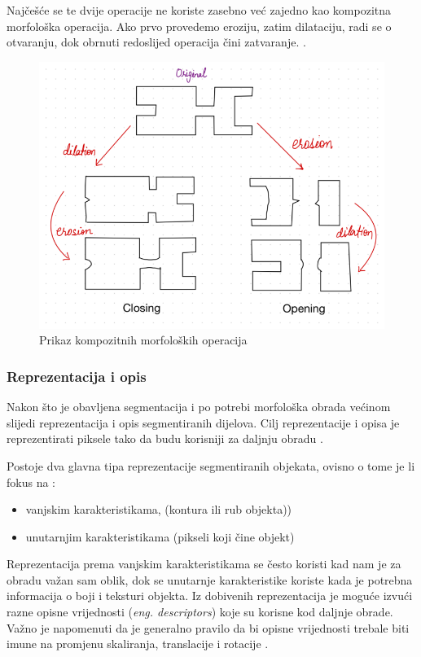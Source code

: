 \documentclass{foi}
\begin{document}
Najčešće se te dvije operacije ne koriste zasebno već zajedno kao kompozitna morfološka operacija. Ako prvo provedemo eroziju, zatim dilataciju, radi se o otvaranju, dok obrnuti redoslijed operacija čini zatvaranje. \cite{morph}.

\begin{figure}[H]
    \centering
    \includegraphics[width=0.6\linewidth]{slike/otvaranje_zatvaranje.png}
    \caption{Prikaz kompozitnih morfoloških operacija \cite{morph}}
\end{figure}

\subsubsection{Reprezentacija i opis}
Nakon što je obavljena segmentacija i po potrebi morfološka obrada većinom slijedi reprezentacija i opis segmentiranih dijelova. Cilj reprezentacije i opisa je reprezentirati piksele tako da budu korisniji za daljnju obradu \cite{RepAndDesc}. 

\begin{flushleft}
    Postoje dva glavna tipa reprezentacije segmentiranih objekata, ovisno o tome je li fokus na \cite{RepAndDesc}:

\begin{itemize}
    \item vanjskim karakteristikama, (kontura ili rub objekta))
    \item unutarnjim karakteristikama (pikseli koji čine objekt)
\end{itemize}
\end{flushleft}

Reprezentacija prema vanjskim karakteristikama se često koristi kad nam je za obradu važan sam oblik, dok se unutarnje karakteristike koriste kada je potrebna informacija o boji i teksturi objekta. Iz dobivenih reprezentacija je moguće izvući razne opisne vrijednosti (\textit{eng. descriptors}) koje su korisne kod daljnje obrade. Važno je napomenuti da je generalno pravilo da bi opisne vrijednosti trebale biti imune na promjenu skaliranja, translacije i rotacije \cite{RepAndDesc}.
\end{document}
